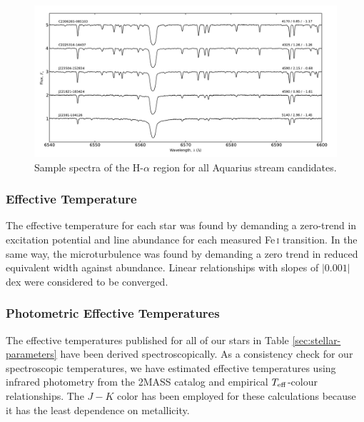 \documentclass{emulateapj}
\begin{document}
\begin{figure}[t!]
	\includegraphics[width=\textwidth]{./figures/spectra-h-alpha.pdf}
	\caption{Sample spectra of the H-$\alpha$ region for all Aquarius stream candidates.}
	\label{fig:spectra-h-alpha}
\end{figure}

\subsubsection{Effective Temperature}
\label{sec:effective-teffs}
The effective temperature for each star was found by demanding a zero-trend in excitation potential and line abundance for each measured Fe\,\textsc{i} transition. In the same way, the microturbulence was found by demanding a zero trend in reduced equivalent width against abundance. Linear relationships with slopes of $|0.001|$ dex were considered to be converged. 

\subsubsection{Photometric Effective Temperatures}
\label{sec:photometric-temperatures}

The effective temperatures published for all of our stars in Table \ref{sec:stellar-parameters} have been derived spectroscopically. As a consistency check for our spectroscopic temperatures, we have estimated effective temperatures using infrared photometry from the 2MASS catalog and empirical $T_{\rm eff}$-colour relationships. The $J-K$ color has been employed for these calculations because it has the least dependence on metallicity. 
\end{document}
